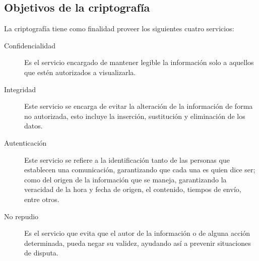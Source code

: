%
%

\subsection{Objetivos de la criptografía}

La criptografía tiene como finalidad proveer los siguientes cuatro servicios:

\begin{description}

  \item[Confidencialidad]
    Es el servicio encargado de mantener legible la información solo a
    aquellos que estén autorizados a visualizarla.

  \item[Integridad]
    Este servicio se encarga de evitar la alteración de la información de
    forma no autorizada, esto incluye la inserción, sustitución y
    eliminación de los datos.

  \item[Autenticación]
    Este servicio se refiere a la identificación tanto de las personas que
    establecen una comunicación, garantizando que cada una es quien dice
    ser; como del origen de la información que se maneja, garantizando la
    veracidad de la hora y fecha de origen, el contenido, tiempos de
    envío, entre otros.

  \item[No repudio]
    Es el servicio que evita que el autor de la información o de alguna
    acción determinada, pueda negar su validez, ayudando así a prevenir
    situaciones de disputa.

\end{description}
